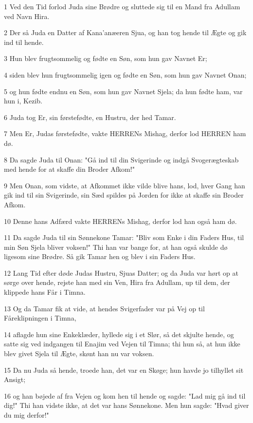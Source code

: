 \par 1 Ved den Tid forlod Juda sine Brødre og sluttede sig til en Mand fra Adullam ved Navn Hira.
\par 2 Der så Juda en Datter af Kana'anæeren Sjua, og han tog hende til Ægte og gik ind til hende.
\par 3 Hun blev frugtsommelig og fødte en Søn, som hun gav Navnet Er;
\par 4 siden blev hun frugtsommelig igen og fødte en Søn, som hun gav Navnet Onan;
\par 5 og hun fødte endnu en Søn, som hun gav Navnet Sjela; da hun fødte ham, var hun i, Kezib.
\par 6 Juda tog Er, sin førstefødte, en Hustru, der hed Tamar.
\par 7 Men Er, Judas førstefødte, vakte HERRENs Mishag, derfor lod HERREN ham dø.
\par 8 Da sagde Juda til Onan: "Gå ind til din Svigerinde og indgå Svogerægteskab med hende for at skaffe din Broder Afkom!"
\par 9 Men Onan, som vidste, at Afkommet ikke vilde blive hans, lod, hver Gang han gik ind til sin Svigerinde, sin Sæd spildes på Jorden for ikke at skaffe sin Broder Afkom.
\par 10 Denne hans Adfærd vakte HERRENs Mishag, derfor lod han også ham dø.
\par 11 Da sagde Juda til sin Sønnekone Tamar: "Bliv som Enke i din Faders Hus, til min Søn Sjela bliver voksen!" Thi han var bange for, at han også skulde dø ligesom sine Brødre. Så gik Tamar hen og blev i sin Faders Hus.
\par 12 Lang Tid efter døde Judas Hustru, Sjuas Datter; og da Juda var hørt op at sørge over hende, rejste han med sin Ven, Hira fra Adullam, up til dem, der klippede hans Får i Timna.
\par 13 Og da Tamar fik at vide, at hendes Svigerfader var på Vej op til Fåreklipningen i Timna,
\par 14 aflagde hun sine Enkeklæder, hyllede sig i et Slør, så det skjulte hende, og satte sig ved indgangen til Enajim ved Vejen til Timna; thi hun så, at hun ikke blev givet Sjela til Ægte, skønt han nu var voksen.
\par 15 Da nu Juda så hende, troede han, det var en Skøge; hun havde jo tilhyllet sit Ansigt;
\par 16 og han bøjede af fra Vejen og kom hen til hende og sagde: "Lad mig gå ind til dig!" Thi han vidste ikke, at det var hans Sønnekone. Men hun sagde: "Hvad giver du mig derfor!"
